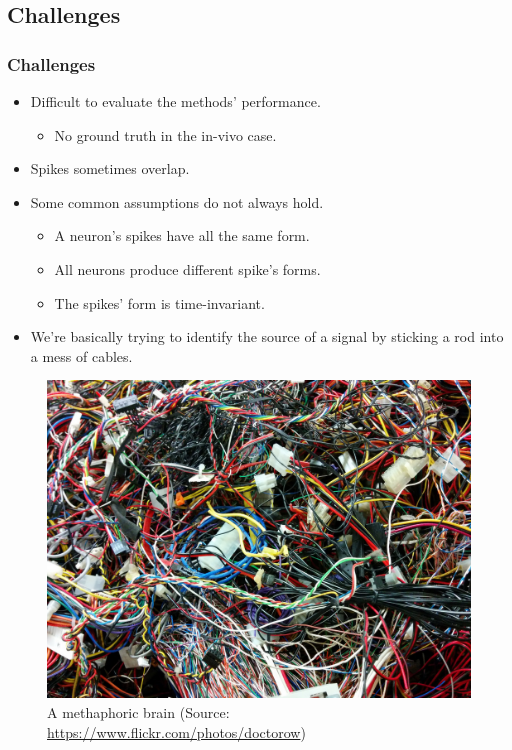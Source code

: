 \documentclass[11pt]{beamer}
\begin{document}
	\begin{frame}
		\section{Challenges}
		\frametitle{Challenges}
		\begin{itemize}
			\item Difficult to evaluate the methods' performance.
			\begin{itemize}
				\item No ground truth in the in-vivo case.
			\end{itemize}
			\item Spikes sometimes overlap.
			\item Some common assumptions do not always hold.
			\begin{itemize}
				\item A neuron's spikes have all the same form.
				\item All neurons produce different spike's forms.
				\item The spikes' form is time-invariant.
			\end{itemize}
		\end{itemize}
	\end{frame}
	\begin{frame}
		\begin{itemize}
			\item We're basically trying to identify the source of a signal by sticking a rod into a mess of cables.
		\end{itemize}
		\begin{figure}[p]
			\centering
			\includegraphics[scale=0.15]{images/tangled_cables.jpg}
			\caption{A methaphoric brain (Source: \url{https://www.flickr.com/photos/doctorow})}
		\end{figure}
	\end{frame}
\end{document}
